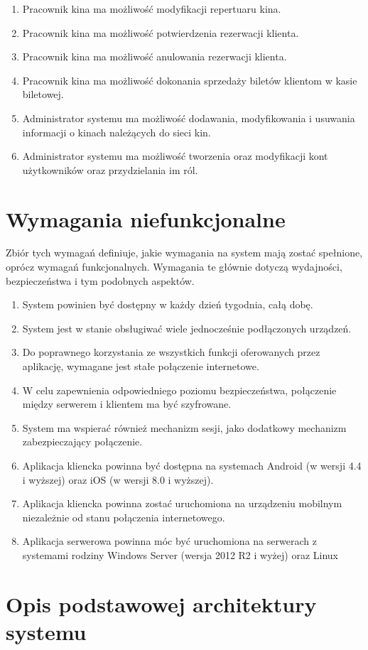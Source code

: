 \begin{enumerate}
\item Pracownik kina ma możliwość modyfikacji repertuaru kina.
\item Pracownik kina ma możliwość potwierdzenia rezerwacji klienta.
\item Pracownik kina ma możliwość anulowania rezerwacji klienta.
\item Pracownik kina ma możliwość dokonania sprzedaży biletów klientom w kasie biletowej.
\item Administrator systemu ma możliwość dodawania, modyfikowania i usuwania informacji o kinach należących do sieci kin.
\item Administrator systemu ma możliwość tworzenia oraz modyfikacji kont użytkowników oraz przydzielania im ról.
\end{enumerate}
\section{Wymagania niefunkcjonalne}
Zbiór tych wymagań definiuje, jakie wymagania na system mają zostać spełnione, oprócz wymagań funkcjonalnych. Wymagania te głównie dotyczą wydajności, bezpieczeństwa i tym podobnych aspektów.
\begin{enumerate}
\item System powinien być dostępny w każdy dzień tygodnia, całą dobę.
\item System jest w stanie obsługiwać wiele jednocześnie podłączonych urządzeń.
\item Do poprawnego korzystania ze wszystkich funkcji oferowanych przez aplikację, wymagane jest stałe połączenie internetowe.
\item W celu zapewnienia odpowiedniego poziomu bezpieczeństwa, połączenie między serwerem i klientem ma być szyfrowane.
\item System ma wspierać również mechanizm sesji, jako dodatkowy mechanizm zabezpieczający połączenie.
\item Aplikacja kliencka powinna być dostępna na systemach Android (w wersji 4.4 i wyższej) oraz iOS (w wersji 8.0 i wyższej).
\item Aplikacja kliencka powinna zostać uruchomiona na urządzeniu mobilnym niezależnie od stanu połączenia internetowego.
\item Aplikacja serwerowa powinna móc być uruchomiona na serwerach z systemami rodziny Windows Server (wersja 2012 R2 i wyżej) oraz Linux

\end{enumerate}
\section{Opis podstawowej architektury systemu}
